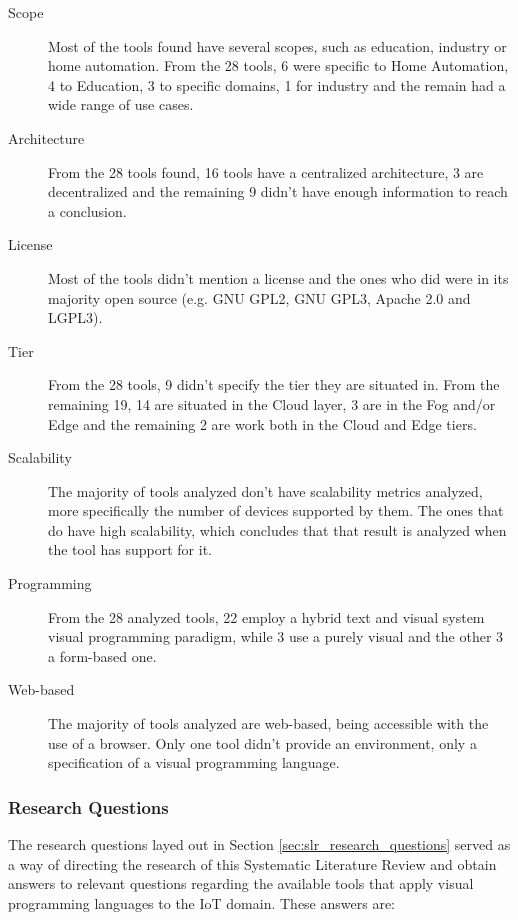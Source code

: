 \begin{description}
    \item [Scope] Most of the tools found have several scopes, such as education, industry or home automation. From the 28 tools, 6 were specific to Home Automation, 4 to Education, 3 to specific domains, 1 for industry and the remain had a wide range of use cases.
    \item [Architecture] From the 28 tools found, 16 tools have a centralized architecture, 3 are decentralized and the remaining 9 didn't have enough information to reach a conclusion.
    \item [License] Most of the tools didn't mention a license and the ones who did were in its majority open source (e.g. GNU GPL2, GNU GPL3, Apache 2.0 and LGPL3). 
    \item [Tier] From the 28 tools, 9 didn't specify the tier they are situated in. From the remaining 19, 14 are situated in the Cloud layer, 3 are in the Fog and/or Edge and the remaining 2 are work both in the Cloud and Edge tiers.
    \item [Scalability] The majority of tools analyzed don't have scalability metrics analyzed, more specifically the number of devices supported by them. The ones that do have high scalability, which concludes that that result is analyzed when the tool has support for it.
    \item [Programming] From the 28 analyzed tools, 22 employ a hybrid text and visual system visual programming paradigm, while 3 use a purely visual and the other 3 a form-based one. 
    \item [Web-based] The majority of tools analyzed are web-based, being accessible with the use of a browser. Only one tool didn't provide an environment, only a specification of a visual programming language.
\end{description}

\subsubsection{Research Questions}\label{sec:answer_slr_research_questions}

The research questions layed out in Section \ref{sec:slr_research_questions} served as a way of directing the research of this Systematic Literature Review and obtain answers to relevant questions regarding the available tools that apply visual programming languages to the IoT domain. These answers are:

